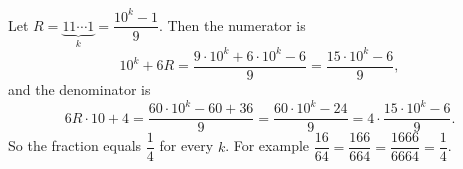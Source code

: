 Let $R=\underbrace{11\cdots1}_{k}=\dfrac{10^k-1}{9}$. Then the numerator is
\[10^k+6R=\dfrac{9\cdot10^k+6\cdot10^k-6}{9}=\dfrac{15\cdot10^k-6}{9},\]
and the denominator is
\[6R\cdot10+4=\dfrac{60\cdot10^k-60+36}{9}=\dfrac{60\cdot10^k-24}{9}=4\cdot\dfrac{15\cdot10^k-6}{9}.\]
So the fraction equals $\boxed{\dfrac14}$ for every $k$. For example $\dfrac{16}{64}=\dfrac{166}{664}=\dfrac{1666}{6664}=\dfrac14$.
